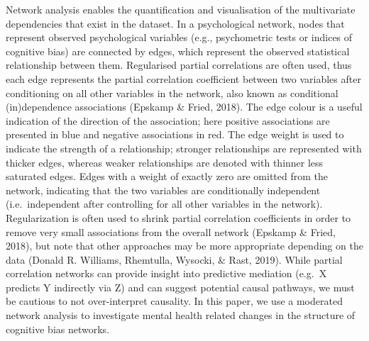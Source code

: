 \documentclass[
  english,
  man]{apa6}
\begin{document}
Network analysis enables the quantification and visualisation of the multivariate dependencies that exist in the dataset. In a psychological network, nodes that represent observed psychological variables (e.g., psychometric tests or indices of cognitive bias) are connected by edges, which represent the observed statistical relationship between them. Regularised partial correlations are often used, thus each edge represents the partial correlation coefficient between two variables after conditioning on all other variables in the network, also known as conditional (in)dependence associations (Epskamp \& Fried, 2018). The edge colour is a useful indication of the direction of the association; here positive associations are presented in blue and negative associations in red. The edge weight is used to indicate the strength of a relationship; stronger relationships are represented with thicker edges, whereas weaker relationships are denoted with thinner less saturated edges. Edges with a weight of exactly zero are omitted from the network, indicating that the two variables are conditionally independent (i.e.~independent after controlling for all other variables in the network). Regularization is often used to shrink partial correlation coefficients in order to remove very small associations from the overall network (Epskamp \& Fried, 2018), but note that other approaches may be more appropriate depending on the data (Donald R. Williams, Rhemtulla, Wysocki, \& Rast, 2019). While partial correlation networks can provide insight into predictive mediation (e.g.~X predicts Y indirectly via Z) and can suggest potential causal pathways, we must be cautious to not over-interpret causality. In this paper, we use a moderated network analysis to investigate mental health related changes in the structure of cognitive bias networks.
\end{document}
